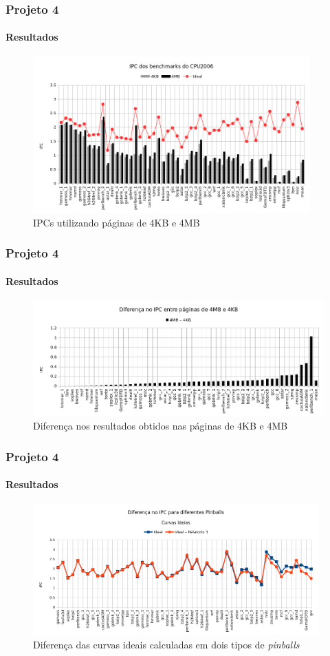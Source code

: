 \documentclass[10pt]{beamer}
\begin{document}
\begin{frame}
\frametitle{Projeto 4}
\framesubtitle{Resultados}

\begin{figure}
\includegraphics[width=0.95\textwidth]{images/ipc}
\caption{IPCs utilizando páginas de 4KB e 4MB}
\end{figure}

\end{frame}

\begin{frame}
\frametitle{Projeto 4}
\framesubtitle{Resultados}

\begin{figure}
\includegraphics[width=\textwidth]{images/diferenca}
\caption{Diferença nos resultados obtidos nas páginas de 4KB e 4MB}
\end{figure}

\end{frame}

\begin{frame}
\frametitle{Projeto 4}
\framesubtitle{Resultados}

\begin{figure}
\includegraphics[width=0.98\textwidth]{images/ideal_pinballs}
\caption{Diferença das curvas ideais calculadas em dois tipos de
\textit{pinballs}}
\end{figure}

\end{frame}
\end{document}
